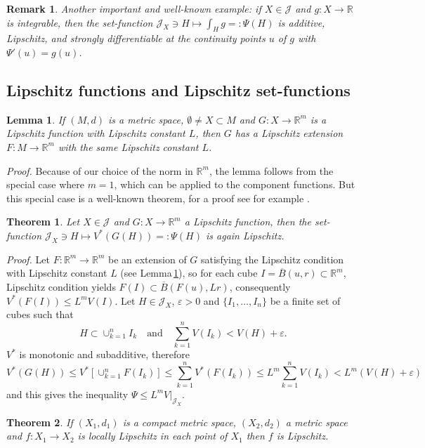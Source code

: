 \documentclass{article}
\newcommand{\proof}[1]{\textit{Proof. }#1}
\newtheorem{theorem}{Theorem}
\newtheorem{remark}{Remark}
\newtheorem{lemma}{Lemma}
\newcommand{\R}{\ensuremath{\mathbb R}}
\newcommand{\J}{\mathscr{J}}
\newcommand{\ee}{\varepsilon}
\newcommand{\ol}{\overline}
\begin{document}
\begin{remark}\label{indef}
Another important and well-known example: if $X\in\J$ and $g\colon
X\to\R$ is integrable, then the set-function $\J_X\ni
H\mapsto\int_Hg=:\Psi(H)$ is additive, Lipschitz, and strongly
differentiable at the continuity points $u$ of $g$ with
$\Psi'(u)=g(u)$.
\end{remark}

\subsection{Lipschitz functions and Lipschitz set-functions}

\begin{lemma}\label{Lipkiterj}
If $(M,d)$ is a metric space, $\emptyset\neq X\subset M$ and
$G\colon X\to\R^m$ is a Lipschitz function with Lipschitz constant
$L$, then $G$ has a Lipschitz extension $F\colon M\to\R^m$ with
the same Lipschitz constant $L$.
\end{lemma}
\proof{ Because of our choice of the norm in $\R^m$, the lemma
follows from the special case where $m=1$, which can be applied to
the component functions. But this special case is a well-known
theorem, for a proof see for example \cite[6.6.5 and
6.6.6]{Pfeffer:93}. }%

\begin{theorem}\label{VGHLip}
Let $X\in\J$ and $G\colon X\to\R^m$ a Lipschitz function, then the
set-function $\J_X\ni H\mapsto V^{*}(G(H))=:\Psi(H)$ is again
Lipschitz.
\end{theorem}
\proof{ Let $F\colon\R^m\to\R^m$ be an extension of $G$ satisfying the
Lipschitz condition with Lipschitz constant $L$ (see
Lemma\,\ref{Lipkiterj}), so for each cube
$I=\ol{B}(u,r)\subset\R^m$, Lipschitz condition yields
$F(I)\subset\ol{B}(F(u),Lr)$, consequently $V^{*}(F(I))\le
L^mV(I)$. Let $H\in\J_X$, $\ee>0$ and $\{I_1,\ldots,I_n\}$ be a
finite set of cubes such that
\[H\subset\cup_{k=1}^nI_k\quad\mbox{and}\quad\sum_{k=1}^nV(I_k)<V(H)+\ee.\]
$V^{*}$ is monotonic and subadditive, therefore
\[V^{*}(G(H))\le V^{*}\left[\cup_{k=1}^nF(I_k)\right]\le
\sum_{k=1}^nV^{*}(F(I_k))\le L^m\sum_{k=1}^nV(I_k)<L^m(V(H)+\ee)\]
and this gives the inequality $\Psi\le L^mV\vert_{\J_X}$.
}%

\begin{theorem}\label{locLip}
If $(X_1,d_1)$ is a compact metric space, $(X_2,d_2)$ a metric
space and $f\colon X_1\to X_2$ is locally Lipschitz in each point
of $X_1$ then $f$ is Lipschitz.
\end{theorem}
\end{document}
